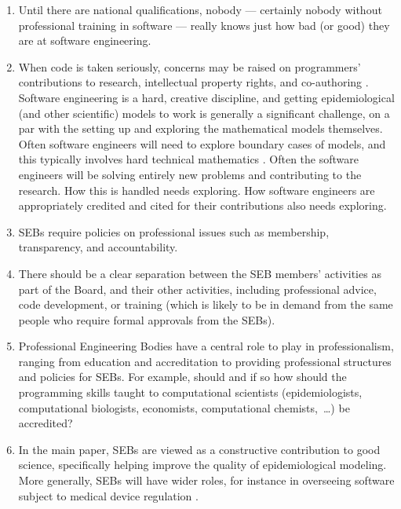 \documentclass[10pt,a4paper]{article}
\begin{document}
\begin{enumerate}\raggedright
\item 
Until there are national qualifications, nobody --- certainly nobody without professional training in software --- really knows just how bad (or good) they are at software engineering.

\item
When code is taken seriously, concerns may be raised on programmers' contributions to research, intellectual property rights, and co-authoring \cite{vancouver}. Software engineering is a hard, creative discipline, and getting epidemiological (and other scientific) models to work is generally a significant challenge, on a par with the setting up and exploring the mathematical models themselves. Often software engineers will need to explore boundary cases of models, and this typically involves hard technical mathematics \cite{hamming}. Often the software engineers will be solving entirely new problems and contributing to the research. How this is handled needs exploring. How software engineers are appropriately credited and cited for their contributions also needs exploring.

\item 
SEBs require policies on professional issues such as membership, transparency, and accountability.
 
\item
There should be a clear separation between the SEB members' activities as part of the Board, and their other activities, including professional advice, code development, or training (which is likely to be in demand from the same people who require formal approvals from the SEBs).

\item
Professional Engineering Bodies have a central role to play in professionalism, ranging from education and accreditation to providing professional structures and policies for SEBs. For example, should and if so how should the programming skills taught to computational scientists (epidemiologists, computational biologists, economists, computational chemists,~\ldots\@) be accredited?

\item
In the main paper, SEBs are viewed as a constructive contribution to good science, specifically helping improve the quality of epidemiological modeling. More generally, SEBs will have wider roles, for instance in overseeing software subject to medical device regulation \cite{fixit}.


\end{enumerate}
\end{document}
